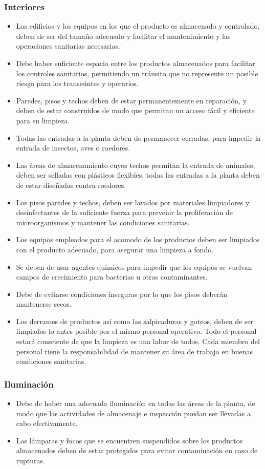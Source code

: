 \subsubsection{Interiores}
\begin{itemize}
	\item Los edificios y los equipos en los que el producto es almacenado y controlado, deben de ser del tamaño adecuado y facilitar el mantenimiento y las operaciones sanitarias necesarias.
	\item Debe haber suficiente espacio entre los productos almacenados para facilitar los controles sanitarios, permitiendo un tránsito que no represente un posible riesgo para los transeúntes y operarios.
	\item Paredes, pisos y techos deben de estar permanentemente en reparación, y deben de estar construidos de modo que permitan un acceso fácil y eficiente para su limpieza.
	\item Todas las entradas a la planta deben de permanecer cerradas, para impedir la entrada de insectos, aves o roedores.
	\item Las áreas de almacenamiento cuyos techos permitan la entrada de animales, deben ser selladas con plásticos flexibles, todas las entradas a la planta deben de estar diseñadas contra roedores.
	\item Los pisos paredes y techos, deben ser lavados por materiales limpiadores y desinfectantes de la suficiente fuerza para prevenir la proliferación de microorganismos y mantener las condiciones sanitarias.
	\item Los equipos empleados para el acomodo de los productos deben ser limpiados con el producto adecuado, para asegurar una limpieza a fondo.
	\item Se deben de usar agentes químicos para impedir que los equipos se vuelvan campos de crecimiento para bacterias u otros contaminantes.
	\item Debe de evitarse condiciones inseguras por lo que los pisos deberán mantenerse secos.
	\item Los derrames de productos así como las salpicaduras y goteos, deben de ser limpiados lo antes posible por el mismo personal operativo. Todo el personal estará consciente de que la limpieza es una labor de todos. Cada miembro del personal tiene la responsabilidad de mantener su área de trabajo en buenas condiciones sanitarias.
\end{itemize}

\subsubsection{Iluminación}
\begin{itemize}
	\item Debe de haber una adecuada iluminación en todas las áreas de la planta, de modo que las actividades de almacenaje e inspección puedan ser llevadas a cabo efectivamente.
	\item Las lámparas y focos que se encuentren suspendidos sobre los productos almacenados deben de estar protegidos para evitar contaminación en caso de rupturas.
\end{itemize}

